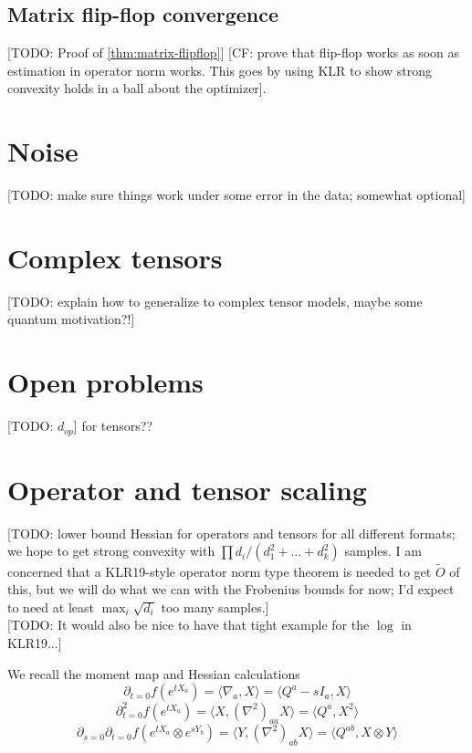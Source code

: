 \documentclass{article}
\newcommand{\CF}[1]{{\color{purple}[CF: #1]}}
\newcommand{\TODO}[1]{{\color{blue}[TODO: #1]}}
\begin{document}
\subsection{Matrix flip-flop convergence}
\TODO{Proof of \cref{thm:matrix-flipflop}}
\CF{prove that flip-flop works as soon as estimation in operator norm works. This goes by using KLR to show strong convexity holds in a ball about the optimizer}.






\section{Noise}
\TODO{make sure things work under some error in the data; somewhat optional}


\section{Complex tensors}
\TODO{explain how to generalize to complex tensor models, maybe some quantum motivation?!}

\section{Open problems}
\TODO{$d_{op}$} for tensors??








\appendix




\section{Operator and tensor scaling}\label{sec:scaling}
\TODO{lower bound Hessian for operators and tensors for all different formats; we hope to get strong convexity with $\prod d_i /(d_1^2 + \dots + d_k^2)$ samples. I am concerned that a KLR19-style operator norm type theorem is needed to get $\tilde{O}$ of this, but we will do what we can with the Frobenius bounds for now; I'd expect to need at least $\max_i \sqrt{d_i}$ too many samples.}\\
\TODO{It would also be nice to have that tight example for the $\log$ in KLR19...}

We recall the moment map and Hessian calculations
\[ \partial_{t=0} f(e^{tX_{a}}) = \langle \nabla_{a}, X \rangle = \langle Q^{a} - sI_{a}, X \rangle   \]
\[ \partial_{t=0}^{2} f(e^{tX_{a}}) = \langle X, (\nabla^{2})_{aa} X \rangle = \langle Q^{a}, X^{2} \rangle  \]
\[ \partial_{s=0} \partial_{t=0} f(e^{tX_{a}} \otimes e^{sY_{b}}) = \langle Y, (\nabla^{2})_{ab} X \rangle = \langle Q^{ab}, X \otimes Y \rangle   \]
\end{document}
